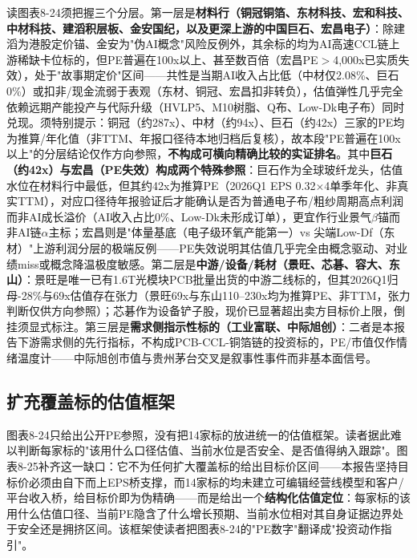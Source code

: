 读图表8-24须把握三个分层。第一层是\textbf{材料行（铜冠铜箔、东材科技、宏和科技、中材科技、建滔积层板、金安国纪，以及更深上游的中国巨石、宏昌电子）}：除建滔为港股定价锚、金安为"伪AI概念"风险反例外，其余标的均为AI高速CCL链上游稀缺卡位标的，但PE普遍在100x以上、甚至数百倍（宏昌PE$>$4,000x已实质失效），处于"故事期定价"区间——共性是当期AI收入占比低（中材仅2.08\%、巨石0\%）或扣非/现金流弱于表观（东材、铜冠、宏昌扣非转负），估值弹性几乎完全依赖远期产能投产与代际升级（HVLP5、M10树脂、Q布、Low-Dk电子布）同时兑现。须特别提示：铜冠（约287x）、中材（约94x）、巨石（约42x）三家的PE均为推算/年化值（非TTM、年报口径待本地归档后复核），故本段"PE普遍在100x以上"的分层结论仅作方向参照，\textbf{不构成可横向精确比较的实证排名}。其中\textbf{巨石（约42x）与宏昌（PE失效）构成两个特殊参照}：巨石作为全球玻纤龙头，估值水位在材料行中最低，但其约42x为推算PE（2026Q1 EPS 0.32$\times$4单季年化、非真实TTM），对应口径待年报验证后才能确认是否为普通电子布/粗纱周期高点利润而非AI成长溢价（AI收入占比0\%、Low-Dk未形成订单），更宜作行业景气$\beta$锚而非AI链$\alpha$主标；宏昌则是"体量基底（电子级环氧产能第一）vs 尖端Low-Df（东材）"上游利润分层的极端反例——PE失效说明其估值几乎完全由概念驱动、对业绩miss或概念降温极度敏感。第二层是\textbf{中游/设备/耗材（景旺、芯碁、容大、东山）}：景旺是唯一已有1.6T光模块PCB批量出货的中游二线标的，但其2026Q1归母-28\%与69x估值存在张力（景旺69x与东山110--230x均为推算PE、非TTM，张力判断仅供方向参照）；芯碁作为设备铲子股，现价已显著超出卖方目标价上限，倒挂须显式标注。第三层是\textbf{需求侧指示性标的（工业富联、中际旭创）}：二者是本报告下游需求侧的先行指标，不构成PCB-CCL-铜箔链的投资标的，PE/市值仅作情绪温度计——中际旭创市值与贵州茅台交叉是叙事性事件而非基本面信号。

\subsection*{扩充覆盖标的估值框架}

图表8-24只给出公开PE参照，没有把14家标的放进统一的估值框架。读者据此难以判断每家标的"该用什么口径估值、当前水位是否安全、是否值得纳入跟踪"。图表8-25补齐这一缺口：它不为任何扩大覆盖标的给出目标价区间——本报告坚持目标价必须由自下而上EPS桥支撑，而14家标的均未建立可编辑经营线模型和客户/平台收入桥，给目标价即为伪精确——而是给出一个\textbf{结构化估值定位}：每家标的该用什么估值口径、当前PE隐含了什么增长预期、当前水位相对其自身证据边界处于安全还是拥挤区间。该框架使读者把图表8-24的"PE数字"翻译成"投资动作指引"。


